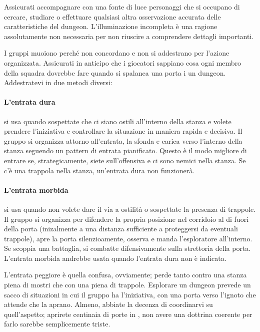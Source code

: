 Assicurati accompagnare con una fonte di luce personaggi che si occupano di cercare, studiare o effettuare qualsiasi altra osservazione accurata delle caratteristiche del dungeon. L'illuminazione incompleta è una ragione assolutamente non necessaria per non riuscire a comprendere dettagli importanti.


I gruppi muoiono perché non concordano e non si addestrano per l'azione organizzata. Assicurati in anticipo che i giocatori sappiano cosa ogni membro della squadra dovrebbe fare quando si spalanca una porta i un dungeon. Addestratevi in due metodi diversi:

\paragraph{L'entrata dura} si usa quando sospettate che ci siano ostili all'interno della stanza e volete prendere l'iniziativa e controllare la situazione in maniera rapida e decisiva. Il gruppo si organizza attorno all'entrata, la sfonda e carica verso l'interno della stanza seguendo un pattern di entrata pianificato. Questo è il modo migliore di entrare se, strategicamente, siete sull'offensiva e ci sono nemici nella stanza. Se c'è una trappola nella stanza, un'entrata dura non funzionerà.

\paragraph{L'entrata morbida} si usa quando non volete dare il via a ostilità o sospettate la presenza di trappole. Il gruppo si organizza per difendere la propria posizione nel corridoio al di fuori della porta (inizalmente a una distanza sufficiente a proteggersi da eventuali trappole), apre la porta silenzioamente, osserva e manda l'esploratore all'interno. Se scoppia una battaglia, si combatte difensivamente sulla strettoria della porta. L'entrata morbida andrebbe usata quando l'entrata dura non è indicata.

L'entrata peggiore è quella confusa, ovviamente; perde tanto contro una stanza piena di mostri che con una piena di trappole. Esplorare un dungeon prevede un sacco di situazioni in cui il gruppo ha l'iniziativa, con una porta verso l'ignoto che attende che la aprano. Almeno, abbiate la decenza di coordinarvi su quell'aspetto; aprirete centinaia di porte in \dnd, non avere una dottrina coerente per farlo sarebbe semplicemente triste.

